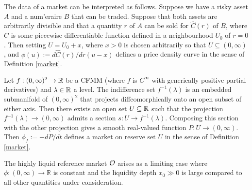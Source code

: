 The data of a market can be interpreted as follows.
%
Suppose we have a risky asset \(A\) and a num'eraire \(B\) that can be traded. 
%
Suppose that both assets are arbitrarily divisible and that a quantity \(r\) of \(A\) can be sold for \(\hat{C}(r)\) of \(B\), where \(\hat{C}\) is some piecewise-differentiable function defined in a neighbourhood \(U_0\) of \(r=0\). 
%
Then setting \(U=U_0+x\), where \(x>0\) is chosen arbitrarily so that \(U\subseteq(0,\infty)\), and \(\phi(u):=d\hat{C}(r)/dr(u-x)\) defines a price density curve in the sense of Definition \ref{market}. 

\begin{example}[CFMM]

  Let \(f:(0,\infty)^2\rightarrow\mathbb R\) be a CFMM (where $f$ is \(C^\infty\) with generically positive partial derivatives) and \(\lambda\in\mathbb R\) a level. 
  The indifference set \(f^{-1}(\lambda)\) is an embedded submanifold of \((0,\infty)^2\) that projects diffeomorphically onto an open subset of either axis. 
  Then there exists an open set \(U\subseteq\mathbb R\) such that the projection \(f^{-1}(\lambda)\rightarrow (0,\infty)\) admits a section \(s:U\rightarrow f^{-1}(\lambda)\). 
  Composing this section with the other projection gives a smooth real-valued function \(P:U\rightarrow (0,\infty)\). 
  Then \(\phi_f:=-dP/dt\) defines a market on reserve set \(U\) in the sense of Definition \ref{market}.

\end{example}

\begin{comment}
\begin{example}[Limit order book]

  Given a snapshot of a limit order book with a set \((r_i,\ell_i)_{i\in I}\) of limit orders (with size \(r>0\) denominated in the numeraire and limit \(\ell>0\)), we can recover a demand function by the formula 
  \[
    \phi(u) \defeq \sum_{i\in I,\ell_i\leq u}r_i
  \]
  While this provides a realistic model for the execution of a single trade, it is not realistic for the execution of multiple trades in a row, because in a limit order book executing trades always changes the liquidity curve.

\end{example}
\end{comment}

\begin{example} 
  
  The highly liquid reference market \(\mathcal{O}\) arises as a limiting case where \(\phi:(0,\infty)\rightarrow\mathbb{R}\) is constant and the liquidity depth $x_0 \gg 0$ is large compared to all other quantities under consideration.

\end{example}

